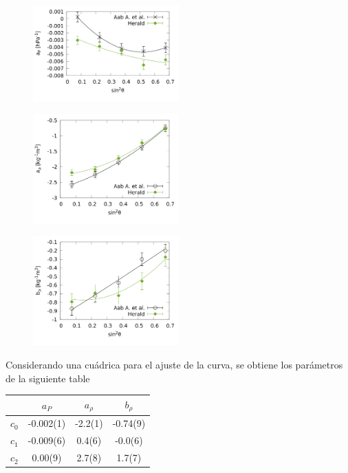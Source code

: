 \begin{figure}[H]
	\centering
	\includegraphics[width=0.5\textwidth]{ap.png}
\end{figure}


\begin{figure}[H]
	\centering
	\includegraphics[width=0.5\textwidth]{arho.png}
\end{figure}


\begin{figure}[H]
	\centering
	\includegraphics[width=0.5\textwidth]{brho.png}
\end{figure}




Considerando una cuádrica para el ajuste de la curva, se obtiene los parámetros de la siguiente table
\begin{table}[H]
\centering
\begin{tabular}{c|c|c|c}
		 	& $a_P$ 	&  $a_\rho$  & $ b_\rho$ \\ \hline
$c_0$ 		& -0.002(1) & 	-2.2(1)	 &	-0.74(9)\\ \hline
$c_1$ 		& -0.009(6)	& 	 0.4(6)	 &	-0.0(6)\\ \hline
$c_2$ 		&  0.00(9) 	& 	 2.7(8)  &	 1.7(7)\\ \hline
\end{tabular}
\end{table}


